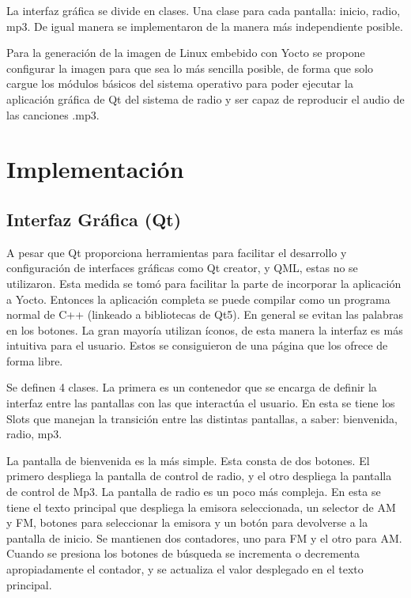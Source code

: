 La interfaz gráfica se divide en clases. Una clase para cada pantalla: inicio, radio, mp3. De igual
manera se implementaron de la manera más independiente posible. 

Para la generación de la imagen de Linux embebido con Yocto se propone
configurar la imagen para que sea lo más sencilla posible, de forma que solo
cargue los módulos básicos del sistema operativo para poder ejecutar la
aplicación gráfica de Qt del sistema de radio y ser capaz de reproducir el audio
de las canciones .mp3.  


\section{Implementación}
\label{sec:implementation}
\subsection{Interfaz Gráfica (Qt)}
\label{sec:qt}

A pesar que Qt proporciona herramientas para facilitar el desarrollo y configuración de interfaces
gráficas como Qt creator, y QML, estas no se utilizaron. Esta medida se tomó para facilitar la parte
de incorporar la aplicación a Yocto. Entonces la aplicación completa se puede compilar como un
programa normal de C++ (linkeado a bibliotecas de Qt5). En general se evitan las palabras en los
botones. La gran mayoría utilizan íconos, de esta manera la interfaz es más intuitiva para el
usuario. Estos se consiguieron de una página que los ofrece de forma libre. %

Se definen 4 clases. La primera es un contenedor que se encarga de definir la interfaz entre las
pantallas con las que interactúa el usuario. En esta se tiene los Slots que manejan la transición
entre las distintas pantallas, a saber: bienvenida, radio, mp3.

La pantalla de bienvenida es la más simple. Esta consta de dos botones. El primero despliega la
pantalla de control de radio, y el otro despliega la pantalla de control de Mp3. La pantalla de
radio es un poco más compleja. En esta se tiene el texto principal que despliega la emisora
seleccionada, un selector de AM y FM, botones para seleccionar la emisora y un botón para devolverse
a la pantalla de inicio. Se mantienen dos contadores, uno para FM y el otro para AM. Cuando se
presiona los botones de búsqueda se incrementa o decrementa apropiadamente el contador, y se
actualiza el valor desplegado en el texto principal.

